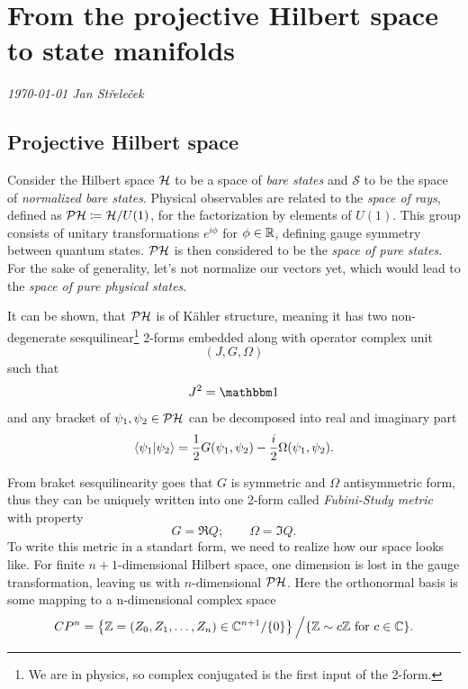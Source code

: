 \chapter{From the projective Hilbert space to state manifolds}
\textit{\today\newline
Jan Střeleček\newline}

\section{Projective Hilbert space}
Consider the Hilbert space $\mathcal{H}$ to be a space of \emph{bare states} and $\mathcal{S}$ to be the space of \emph{normalized bare states}. Physical observables are related to the \emph{space of rays}, defined as $\mathcal{PH}\coloneqq \mathcal{H}/U(1)$, for the factorization by elements of $U(1)$. This group consists of unitary transformations $e^{i\phi}$ for $\phi\in\mathbb{R}$, defining gauge symmetry between quantum states. $\mathcal{PH}$ is then considered to be the \emph{space of pure states}. For the sake of generality, let's not normalize our vectors yet, which would lead to the \emph{space of pure physical states}. 

It can be shown, that $\mathcal{PH}$ is of K\"ahler structure, meaning it has two non-degenerate sesquilinear\footnote{We are in physics, so complex conjugated is the first input of the 2-form.} 2-forms embedded along with operator complex unit
$$(J, G, \Omega)$$
such that
\begin{equation}
    J^2=\Id
\end{equation}
and any bracket of $\psi_1,\psi_2\in \mathcal{PH}$ can be decomposed into real and imaginary part\citep{ashtekar_geometrical_1997}
\begin{equation}
    \braket{\psi_1|\psi_2}=\frac{1}{2}G(\psi_1,\psi_2)-\frac{i}{2}\Omega(\psi_1,\psi_2).
\end{equation}

From braket sesquilinearity goes that $G$ is symmetric and $\Omega$ antisymmetric form, thus they can be uniquely written into one 2-form called \emph{Fubini-Study metric} with property
\begin{equation}
    G=\Re Q ;\qquad \Omega=\Im Q.
\end{equation}
To write this metric in a standart form, we need to realize how our space looks like. For finite $n+1$-dimensional Hilbert space, one dimension is lost in the gauge transformation, leaving us with $n$-dimensional $\mathcal{PH}$. Here the orthonormal basis is some mapping to a n-dimensional complex space 
$$CP^n= \left\{ \mathbb{Z}=(Z_0,Z_1,\dots,Z_n)\in \mathbb{C}^{n+1}/\{0\} \right\}\Big/ \{\mathbb{Z}\sim c\mathbb{Z} \text{ for } c\in \mathbb{C}\}.$$

